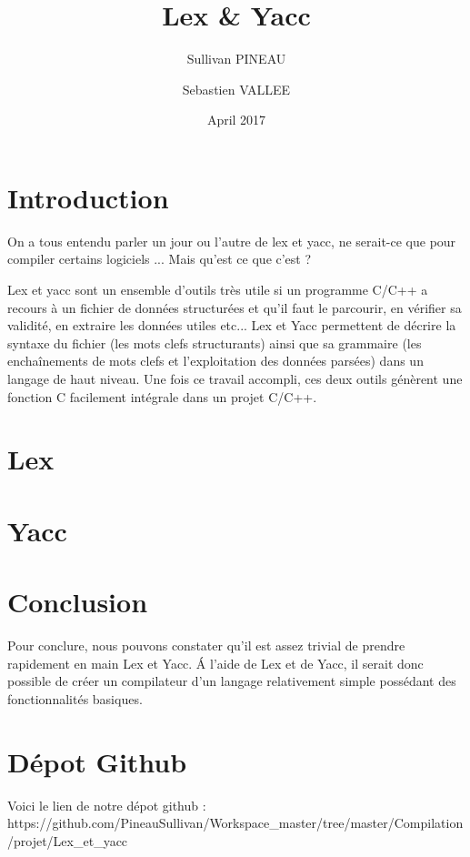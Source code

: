 \documentclass{article}
\title{Lex \& Yacc}
\author{Sullivan PINEAU \and Sebastien VALLEE }
\date{April 2017}
\begin{document}
\maketitle

\section{Introduction}
    On a tous entendu parler un jour ou l'autre de lex et yacc, ne serait-ce que pour compiler certains logiciels ... Mais qu'est ce que c'est ?
    
    Lex et yacc sont un ensemble d'outils très utile si un programme C/C++ a recours à un fichier de données structurées et qu'il faut le parcourir, en vérifier sa validité, en extraire les données utiles etc... Lex et Yacc permettent de décrire la syntaxe du fichier (les mots clefs structurants) ainsi que sa grammaire (les enchaînements de mots clefs et l'exploitation des données parsées) dans un langage de haut niveau. Une fois ce travail accompli, ces deux outils génèrent une fonction C facilement intégrale dans un projet C/C++. 
    
\section{Lex}
    

\section{Yacc}
    

\section{Conclusion}
Pour conclure, nous pouvons constater qu'il est assez trivial de prendre rapidement en main Lex et Yacc.
\newline
\'A l'aide de Lex et de Yacc, il serait donc possible de créer un compilateur d’un langage relativement simple possédant des fonctionnalités basiques.

\section*{Dépot Github}
Voici le lien de notre dépot github : 
\newline
https://github.com/PineauSullivan/Workspace\_master/tree/master/Compilation/projet/Lex\_et\_yacc
\end{document}
